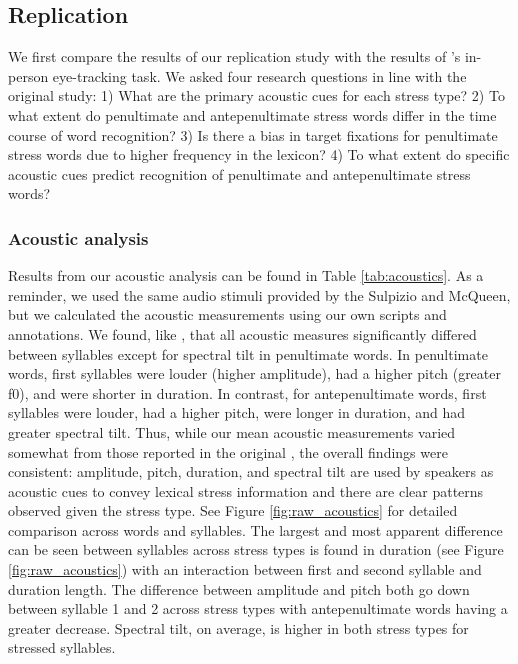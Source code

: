\subsection{Replication}

We first compare the results of our replication study with the results of \cite{Sulpizio_McQueen_2012}'s in-person eye-tracking task. We asked four research questions in line with the original study: 1) What are the primary acoustic cues for each stress type? 2) To what extent do penultimate and antepenultimate stress words differ in the time course of word recognition? 3) Is there a bias in target fixations for penultimate stress words due to higher frequency in the lexicon? 4) To what extent do specific acoustic cues predict recognition of penultimate and antepenultimate stress words?  

\subsubsection{Acoustic analysis}
Results from our acoustic analysis can be found in Table \ref{tab:acoustics}. As a reminder, we used the same audio stimuli provided by the Sulpizio and McQueen, but we calculated the acoustic measurements using our own scripts and annotations. We found, like \cite{Sulpizio_McQueen_2012}, that all acoustic measures significantly differed between syllables except for spectral tilt in penultimate words. In penultimate words, first syllables were louder (higher amplitude), had a higher pitch (greater f0), and were shorter in duration. In contrast, for antepenultimate words, first syllables were louder, had a higher pitch, were longer in duration, and had greater spectral tilt. Thus, while our mean acoustic measurements varied somewhat from those reported in the original \cite{Sulpizio_McQueen_2012}, the overall findings were consistent: amplitude, pitch, duration, and spectral tilt are used by speakers as acoustic cues to convey lexical stress information and there are clear patterns observed given the stress type. See Figure \ref{fig:raw_acoustics} for detailed comparison across words and syllables. The largest and most apparent difference can be seen between syllables across stress types is found in duration (see Figure \ref{fig:raw_acoustics}) with an interaction between first and second syllable and duration length. The difference between amplitude and pitch both go down between syllable 1 and 2 across stress types with antepenultimate words having a greater decrease. Spectral tilt, on average, is higher in both stress types for stressed syllables.

